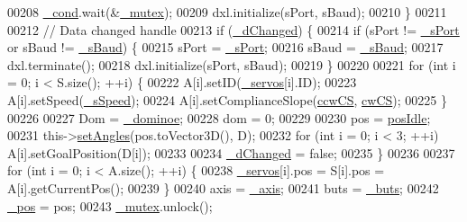 \begin{DoxyCode}
00208             \hyperlink{a00009_afcb93c09acd7fecf47d92996a297365c}{\_cond}.wait(&\hyperlink{a00009_a6327eafc0dac189ec1b202d63ef32457}{\_mutex});
00209             dxl.initialize(sPort, sBaud);
00210         \}       
00211         
00212         \textcolor{comment}{// Data changed handle}
00213         \textcolor{keywordflow}{if} (\hyperlink{a00009_a2b6ccfeacbb3cc9ac5c34549b9aa3f11}{\_dChanged}) \{
00214             \textcolor{keywordflow}{if} (sPort != \hyperlink{a00009_ac9a614aa1518efb49b0a06636bd1bdbf}{\_sPort} or sBaud != \hyperlink{a00009_a5b9a41b9e271275b914affb0a845a2ee}{\_sBaud}) \{
00215                 sPort = \hyperlink{a00009_ac9a614aa1518efb49b0a06636bd1bdbf}{\_sPort};
00216                 sBaud = \hyperlink{a00009_a5b9a41b9e271275b914affb0a845a2ee}{\_sBaud};
00217                 dxl.terminate();
00218                 dxl.initialize(sPort, sBaud);
00219             \}
00220             
00221             \textcolor{keywordflow}{for} (\textcolor{keywordtype}{int} i = 0; i < S.size(); ++i) \{
00222                 A[i].setID(\hyperlink{a00009_a1ac6662fe6d198b5971ae0ffa7ddfcfd}{\_servos}[i].ID);
00223                 A[i].setSpeed(\hyperlink{a00009_a2591c704c80518be7abb1698364cab5e}{\_sSpeed});
00224                 A[i].setComplianceSlope(\hyperlink{a00009_ac2d1087cd0cc45ef71c77aa20b41ceda}{ccwCS}, \hyperlink{a00009_a67b2528edcaa375aefa1fb4117576665}{cwCS});
00225             \}
00226             
00227             Dom = \hyperlink{a00009_ad06a87d9f22914fd2597c939a3eb61cd}{\_dominoe};
00228             dom = 0;
00229             
00230             pos = \hyperlink{a00009_a22328f2a08b4a154a275242ee185aebf}{posIdle};            
00231             this->\hyperlink{a00009_a2b9f97473d19a7defaed3451bc830f79}{setAngles}(pos.toVector3D(), D);
00232             \textcolor{keywordflow}{for} (\textcolor{keywordtype}{int} i = 0; i < 3; ++i) A[i].setGoalPosition(D[i]);
00233             
00234             \hyperlink{a00009_a2b6ccfeacbb3cc9ac5c34549b9aa3f11}{\_dChanged} = \textcolor{keyword}{false};
00235         \}
00236 
00237         \textcolor{keywordflow}{for} (\textcolor{keywordtype}{int} i = 0; i < A.size(); ++i) \{
00238             \hyperlink{a00009_a1ac6662fe6d198b5971ae0ffa7ddfcfd}{\_servos}[i].pos = S[i].pos = A[i].getCurrentPos();
00239         \}
00240         axis = \hyperlink{a00009_a4ddc59272c23925f921e20ee630804c2}{\_axis};
00241         buts = \hyperlink{a00009_a6f956f7e0f2953e213ff95fb64857ab0}{\_buts};
00242         \hyperlink{a00009_a6ad7cef9e9ac7454399871260e3693d4}{\_pos} = pos;
00243         \hyperlink{a00009_a6327eafc0dac189ec1b202d63ef32457}{\_mutex}.unlock();

\end{DoxyCode}
